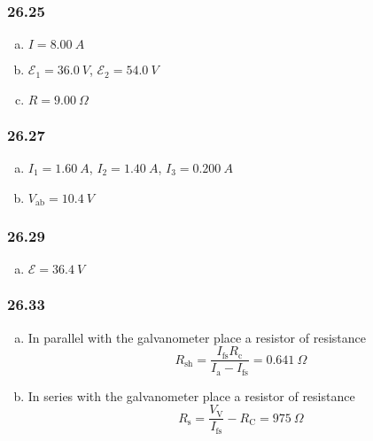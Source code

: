 \documentclass{article}
\begin{document}
\subsubsection{26.25}

\begin{enumerate}[(a)]
  \item $I = \qty{8.00}{A}$

  \item $\mathcal{E}_1 = \qty{36.0}{V}$, $\mathcal{E}_2 = \qty{54.0}{V}$

  \item $R = \qty{9.00}{\Omega}$
\end{enumerate}

\subsubsection{26.27}

\begin{enumerate}[(a)]
  \item $I_1 = \qty{1.60}{A}$, $I_2 = \qty{1.40}{A}$, $I_3 = \qty{0.200}{A}$

  \item $V_\textrm{ab} = \qty{10.4}{V}$
\end{enumerate}

\subsubsection{26.29}

\begin{enumerate}[(a)]
  \item $\mathcal{E} = \qty{36.4}{V}$
\end{enumerate}

\subsubsection{26.33}

\begin{enumerate}[(a)]
  \item In parallel with the galvanometer place a resistor of resistance \[R_\textrm{sh} = \frac{I_\textrm{fs} R_\textrm{c}}{I_\textrm{a} - I_\textrm{fs}} = \qty{0.641}{\Omega}\]

  \item In series with the galvanometer place a resistor of resistance \[R_\textrm{s} = \frac{V_\textrm{V}}{I_\textrm{fs}} - R_\textrm{C} = \qty{975}{\Omega}\]
\end{enumerate}
\end{document}
